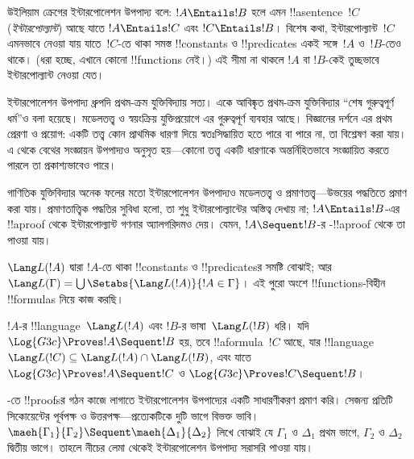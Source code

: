 \documentclass[../../../include/open-logic-section]{subfiles}
\begin{document}


উইলিয়াম ক্রেগের ইন্টারপোলেশন উপপাদ্য বলে: $!A
\Entails !B$ হলে এমন !!a{sentence}~$!C$ (\emph{ইন্টারপোল্যান্ট})
আছে যাতে $!A \Entails !C$ এবং $!C \Entails !B$। বিশেষ কথা,
ইন্টারপোল্যান্ট~$!C$ এমনভাবে নেওয়া যায় যাতে~$!C$-তে থাকা
সমস্ত !!{constant}s ও !!{predicate}s একই সঙ্গে~$!A$ ও~$!B$-তেও
থাকে। (ধরা হচ্ছে, এখানে কোনো !!{function}s নেই।) এই
সীমা না থাকলে $!A$ বা $!B$-কেই তুচ্ছভাবে ইন্টারপোল্যান্ট নেওয়া যেত।

ইন্টারপোলেশন উপপাদ্য ধ্রুপদি প্রথম-ক্রম যুক্তিবিদ্যায় সত্য।
একে আবিষ্কৃত প্রথম-ক্রম যুক্তিবিদ্যার ``শেষ গুরুত্বপূর্ণ ধর্ম''ও
বলা হয়েছে। মডেলতত্ত্ব ও স্বয়ংক্রিয় যুক্তিপ্রয়োগে এর
গুরুত্বপূর্ণ ব্যবহার আছে। বিজ্ঞানের দর্শনে এর প্রথম প্রেরণা ও
প্রয়োগ: একটি তত্ত্ব কোন প্রাথমিক ধারণা দিয়ে স্বতঃসিদ্ধায়িত
হতে পারে বা পারে না, তা বিশ্লেষণ করা যায়। এ থেকে বেথের
সংজ্ঞায়ন উপপাদ্যও অনুসৃত হয়—কোনো তত্ত্ব একটি ধারণাকে
অন্তর্নিহিতভাবে সংজ্ঞায়িত করতে পারলে তা প্রকাশ্যভাবেও পারে।

গাণিতিক যুক্তিবিদ্যার অনেক ফলের মতো ইন্টারপোলেশন উপপাদ্যও
মডেলতত্ত্ব ও প্রমাণতত্ত্ব—উভয়ের পদ্ধতিতে প্রমাণ করা যায়।
প্রমাণতাত্ত্বিক পদ্ধতির সুবিধা হলো, তা শুধু ইন্টারপোল্যান্টের
অস্তিত্ব দেখায় না; $!A \Entails !B$-এর !!a{proof} থেকে
ইন্টারপোল্যান্ট গণনার অ্যালগরিদমও দেয়। যেমন,
$!A \Sequent !B$-র -!!a{proof} থেকে তা পাওয়া যায়।

$\Lang L(!A)$ দ্বারা $!A$-তে থাকা !!{constant}s ও
!!{predicate}sর সমষ্টি বোঝাই; আর
$\Lang L(\Gamma) = \bigcup \Setabs{\Lang L(!A)}{!A \in
\Gamma}$। এই পুরো অংশে !!{function}s-বিহীন
!!{formula}s নিয়ে কাজ করছি।

\begin{thm}[ক্রেগের ইন্টারপোলেশন উপপাদ্য]
$!A$-র !!{language}~$\Lang L(!A)$ এবং $!B$-র
ভাষা~$\Lang L(!B)$ ধরি। যদি
$\Log{G3c} \Proves !A \Sequent !B$ হয়, তবে
!!a{formula}~$!C$ আছে, যার !!{language}~$\Lang L(!C) \subseteq \Lang
L(!A) \cap \Lang L(!B)$, এবং যাতে
$\Log{G3c} \Proves !A \Sequent !C$ ও
$\Log{G3c} \Proves !C \Sequent !B$।
\end{thm}

-তে !!{proof}sর গঠন কাজে লাগাতে ইন্টারপোলেশন
উপপাদ্যের একটি সাধারণীকরণ প্রমাণ করি। সেজন্য প্রতিটি
সিকোয়েন্টের পূর্বপক্ষ ও উত্তরপক্ষ—প্রত্যেকটিকে দুটি ভাগে
বিভক্ত ভাবি। $\maeh{\Gamma_1}{\Gamma_2} \Sequent
\maeh{\Delta_1}{\Delta_2}$ লিখে বোঝাই যে $\Gamma_1$ ও $\Delta_1$
প্রথম ভাগে, $\Gamma_2$ ও $\Delta_2$ দ্বিতীয় ভাগে।
তাহলে নীচের লেমা থেকেই ইন্টারপোলেশন উপপাদ্য সরাসরি পাওয়া যায়।
\end{document}
